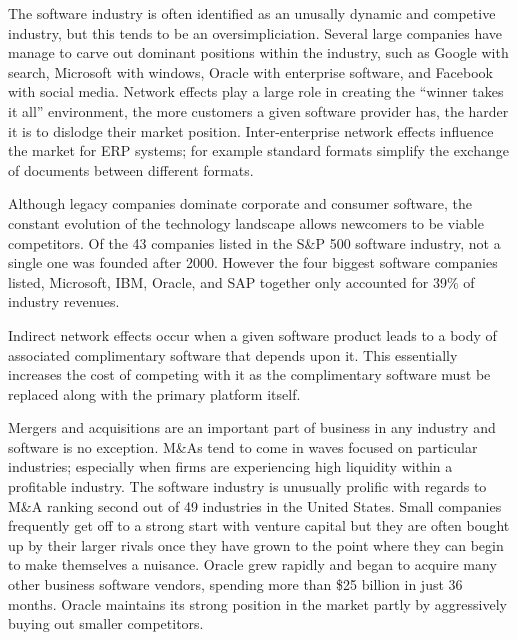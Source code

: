 The software industry is often identified as an unusally dynamic and competive industry, but this tends to be an oversimpliciation. Several large companies have manage to carve out dominant positions within the industry, such as Google with search, Microsoft with windows, Oracle with enterprise software, and Facebook with social media.\autocite[34]{IndustrySurveysInternet}
Network effects play a large role in creating the ``winner takes it all'' environment, the more customers a given software provider has, the harder it is to dislodge their market position.\autocite[21]{buxmann2012software}
Inter-enterprise network effects influence the market for ERP systems; for example standard formats simplify the exchange of documents between different formats.\autocite[21]{buxmann2012software}

Although legacy companies dominate corporate and consumer software, the constant evolution of the technology landscape allows newcomers to be viable competitors.\autocite[38]{SurveysSoftware2015}
Of the 43 companies listed in the S\&P 500 software industry, not a single one was founded after 2000.\autocite[38]{SurveysSoftware2015}
However the four biggest software companies listed, Microsoft, IBM, Oracle, and SAP together only accounted for 39\% of industry revenues.\autocite[38]{SurveysSoftware2015}

Indirect network effects occur when a given software product leads to a body of associated complimentary software that depends upon it.
This essentially increases the cost of competing with it as the complimentary software must be replaced along with the primary platform itself.\autocite[21]{buxmann2012software}

Mergers and acquisitions are an important part of business in any industry and software is no exception.\autocite[421]{schief2013mergers}
M\&As tend to come in waves focused on particular industries; especially when firms are experiencing high liquidity within a profitable industry.\autocite[421]{schief2013mergers}
The software industry is unusually prolific with regards to M\&A ranking second out of 49 industries in the United States.\autocite[421]{schief2013mergers}
Small companies frequently get off to a strong start with venture capital but they are often bought up by their larger rivals once they have grown to the point where they can begin to make themselves a nuisance. \autocite[]{LargeParadigmShiftCloudComputing}\autocite[]{ValuelineOverview}
Oracle grew rapidly and began to acquire many other business software vendors, spending more than \$25 billion in just 36 months.\autocite[114]{finkle2012larry}%
Oracle maintains its strong position in the market partly by aggressively buying out smaller competitors.\autocite[121]{finkle2012larry}

